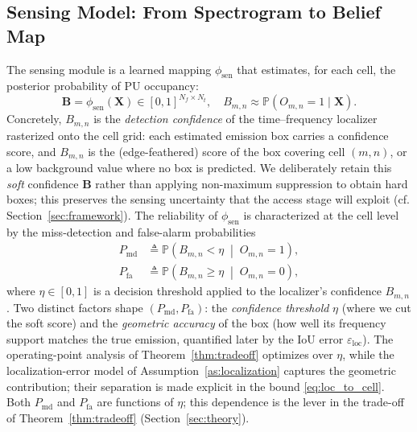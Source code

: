 \documentclass[journal]{IEEEtran}
\newcommand{\Prob}{\mathbb{P}}
\newcommand{\defeq}{\triangleq}
\newcommand{\spec}{\bm{X}}                 %
\newcommand{\Nf}{N_f}                      %
\newcommand{\Nt}{N_t}                      %
\newcommand{\occ}{O}                       %
\newcommand{\bel}{B}                       %
\newcommand{\belmap}{\bm{B}}               %
\newcommand{\Pmd}{P_{\mathrm{md}}}         %
\newcommand{\Pfa}{P_{\mathrm{fa}}}         %
\newcommand{\thr}{\eta}                    %
\newcommand{\eloc}{\varepsilon_{\mathrm{loc}}}
\begin{document}
\subsection{Sensing Model: From Spectrogram to Belief Map}
\label{subsec:sensing}
The sensing module is a learned mapping $\phi_{\mathrm{sen}}$ that estimates,
for each cell, the posterior probability of PU occupancy:
\begin{equation}
\belmap = \phi_{\mathrm{sen}}(\spec) \in [0,1]^{\Nf\times\Nt},
\quad
\bel_{m,n} \approx \Prob(\occ_{m,n}{=}1 \mid \spec).
\label{eq:belief}
\end{equation}
Concretely, $\bel_{m,n}$ is the \emph{detection confidence} of the
time--frequency localizer rasterized onto the cell grid: each estimated
emission box carries a confidence score, and $\bel_{m,n}$ is the (edge-feathered)
score of the box covering cell $(m,n)$, or a low background value where no box
is predicted. We deliberately retain this \emph{soft} confidence $\belmap$
rather than applying non-maximum suppression to obtain hard boxes; this
preserves the sensing uncertainty that the access stage will exploit
(cf. Section~\ref{sec:framework}). The reliability of $\phi_{\mathrm{sen}}$
is characterized at the cell level by the miss-detection and false-alarm
probabilities
\begin{align}
\Pmd &\defeq \Prob\!\left(\bel_{m,n} < \thr \;\middle|\; \occ_{m,n}=1\right),
\label{eq:pmd}\\
\Pfa &\defeq \Prob\!\left(\bel_{m,n} \ge \thr \;\middle|\; \occ_{m,n}=0\right),
\label{eq:pfa}
\end{align}
where $\thr\in[0,1]$ is a decision threshold applied to the localizer's
confidence $\bel_{m,n}$. Two distinct factors shape $(\Pmd,\Pfa)$: the
\emph{confidence threshold} $\thr$ (where we cut the soft score) and the
\emph{geometric accuracy} of the box (how well its frequency support matches
the true emission, quantified later by the IoU error $\eloc$). The
operating-point analysis of Theorem~\ref{thm:tradeoff} optimizes over $\thr$,
while the localization-error model of Assumption~\ref{as:localization}
captures the geometric contribution; their separation is made explicit in the
bound \eqref{eq:loc_to_cell}. Both $\Pmd$ and $\Pfa$ are functions of $\thr$;
this dependence is the lever in the trade-off of
Theorem~\ref{thm:tradeoff} (Section~\ref{sec:theory}).
\end{document}
